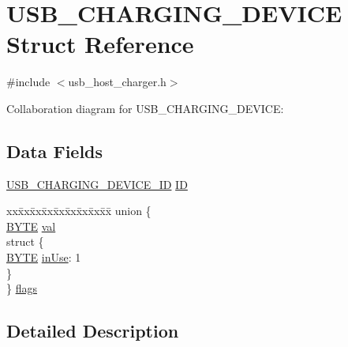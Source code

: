 \hypertarget{struct_u_s_b___c_h_a_r_g_i_n_g___d_e_v_i_c_e}{}\section{U\+S\+B\+\_\+\+C\+H\+A\+R\+G\+I\+N\+G\+\_\+\+D\+E\+V\+I\+C\+E Struct Reference}
\label{struct_u_s_b___c_h_a_r_g_i_n_g___d_e_v_i_c_e}


{\ttfamily \#include $<$usb\+\_\+host\+\_\+charger.\+h$>$}



Collaboration diagram for U\+S\+B\+\_\+\+C\+H\+A\+R\+G\+I\+N\+G\+\_\+\+D\+E\+V\+I\+C\+E\+:
\subsection*{Data Fields}
\begin{DoxyCompactItemize}
\item 
\hyperlink{struct_u_s_b___c_h_a_r_g_i_n_g___d_e_v_i_c_e___i_d}{U\+S\+B\+\_\+\+C\+H\+A\+R\+G\+I\+N\+G\+\_\+\+D\+E\+V\+I\+C\+E\+\_\+\+I\+D} \hyperlink{struct_u_s_b___c_h_a_r_g_i_n_g___d_e_v_i_c_e_abad444517d395d8d2326ee159b45531d}{I\+D}
\item 
\begin{tabbing}
xx\=xx\=xx\=xx\=xx\=xx\=xx\=xx\=xx\=\kill
union \{\\
\>\hyperlink{_generic_type_defs_8h_a4ae1dab0fb4b072a66584546209e7d58}{BYTE} \hyperlink{struct_u_s_b___c_h_a_r_g_i_n_g___d_e_v_i_c_e_a5986ea8162aa0f6608b36b20964044dd}{val}\\
\>struct \{\\
\>\>\hyperlink{_generic_type_defs_8h_a4ae1dab0fb4b072a66584546209e7d58}{BYTE} \hyperlink{struct_u_s_b___c_h_a_r_g_i_n_g___d_e_v_i_c_e_ae8826a7ae8558e4091000ecd0409ece2}{inUse}: 1\\
\>\} \\
\} \hyperlink{struct_u_s_b___c_h_a_r_g_i_n_g___d_e_v_i_c_e_a562b84c9f21b9381086d05133a62f104}{flags}\\

\end{tabbing}\end{DoxyCompactItemize}


\subsection{Detailed Description}


